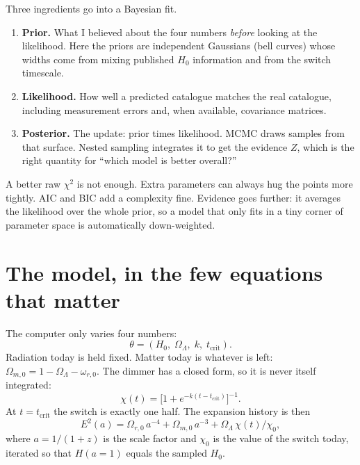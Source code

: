 \documentclass[12pt,letterpaper]{article}
\newcommand{\tcrit}{t_{\mathrm{crit}}}
\begin{document}
Three ingredients go into a Bayesian fit.

\begin{enumerate}[leftmargin=1.6em]
  \item \textbf{Prior.} What I believed about the four numbers
        \emph{before} looking at the likelihood. Here the priors are
        independent Gaussians (bell curves) whose widths come from
        mixing published $H_0$ information and from the switch timescale.
  \item \textbf{Likelihood.} How well a predicted catalogue matches the
        real catalogue, including measurement errors and, when
        available, covariance matrices.
  \item \textbf{Posterior.} The update: prior times likelihood. MCMC
        draws samples from that surface. Nested sampling integrates it
        to get the evidence $Z$, which is the right quantity for
        ``which model is better overall?''
\end{enumerate}

A better raw $\chi^2$ is not enough. Extra parameters can always hug
the points more tightly. AIC and BIC add a complexity fine. Evidence
goes further: it averages the likelihood over the whole prior, so a
model that only fits in a tiny corner of parameter space is
automatically down-weighted.

\section{The model, in the few equations that matter}

The computer only varies four numbers:
\begin{equation}
  \theta = (H_0,\; \Omega_\Lambda,\; k,\; \tcrit).
\end{equation}
Radiation today is held fixed. Matter today is whatever is left:
$\Omega_{m,0}=1-\Omega_\Lambda-\omega_{r,0}$. The dimmer has a closed
form, so it is never itself integrated:
\begin{equation}
  \chi(t)=\bigl[1+e^{-k(t-\tcrit)}\bigr]^{-1}.
\end{equation}
At $t=\tcrit$ the switch is exactly one half. The expansion history is
then
\begin{equation}
  E^2(a)=\Omega_{r,0}\,a^{-4}+\Omega_{m,0}\,a^{-3}
  +\Omega_\Lambda\,\chi(t)/\chi_0,
\end{equation}
where $a=1/(1+z)$ is the scale factor and $\chi_0$ is the value of the
switch today, iterated so that $H(a=1)$ equals the sampled $H_0$.
\end{document}
